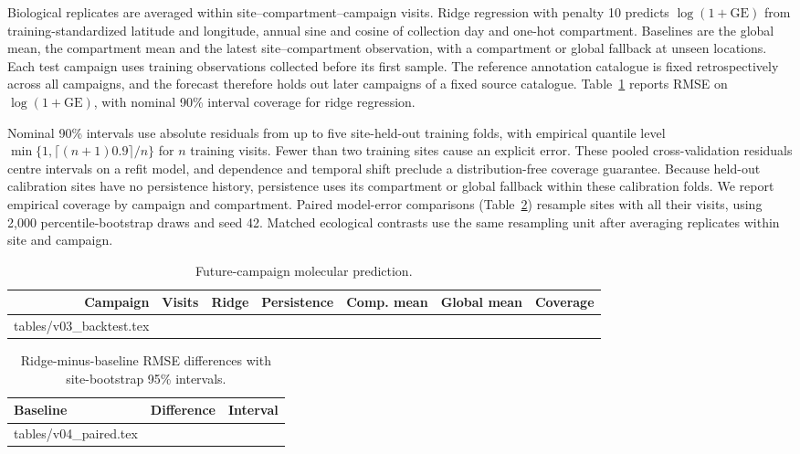 \documentclass[11pt,a4paper]{article}
\makeatletter
\newcommand{\BacktestRows}{\@@input tables/v03_backtest.tex }
\newcommand{\PairedRows}{\@@input tables/v04_paired.tex }
\makeatother
\begin{document}
Biological replicates are averaged within site--compartment--campaign visits. Ridge regression with penalty 10 predicts $\log(1+\mathrm{GE})$ from training-standardized latitude and longitude, annual sine and cosine of collection day and one-hot compartment. Baselines are the global mean, the compartment mean and the latest site--compartment observation, with a compartment or global fallback at unseen locations. Each test campaign uses training observations collected before its first sample. The reference annotation catalogue is fixed retrospectively across all campaigns, and the forecast therefore holds out later campaigns of a fixed source catalogue. Table~\ref{tab:backtest} reports RMSE on $\log(1+\mathrm{GE})$, with nominal 90\% interval coverage for ridge regression.

Nominal 90\% intervals use absolute residuals from up to five site-held-out training folds, with empirical quantile level $\min\{1,\lceil(n+1)0.9\rceil/n\}$ for $n$ training visits. Fewer than two training sites cause an explicit error. These pooled cross-validation residuals centre intervals on a refit model, and dependence and temporal shift preclude a distribution-free coverage guarantee. Because held-out calibration sites have no persistence history, persistence uses its compartment or global fallback within these calibration folds. We report empirical coverage by campaign and compartment. Paired model-error comparisons (Table~\ref{tab:paired}) resample sites with all their visits, using 2,000 percentile-bootstrap draws and seed 42. Matched ecological contrasts use the same resampling unit after averaging replicates within site and campaign.
\begin{table}[ht]\centering\small
\caption{Future-campaign molecular prediction.}\label{tab:backtest}\begin{tabular}{rrrrrrr}\toprule
Campaign & Visits & Ridge & Persistence & Comp. mean & Global mean & Coverage\\\midrule
\BacktestRows
\bottomrule\end{tabular}\end{table}
\begin{table}[ht]\centering\small
\caption{Ridge-minus-baseline RMSE differences with site-bootstrap 95\% intervals.}\label{tab:paired}\begin{tabular}{lrr}\toprule
Baseline & Difference & Interval\\\midrule
\PairedRows
\bottomrule\end{tabular}\end{table}
\end{document}
